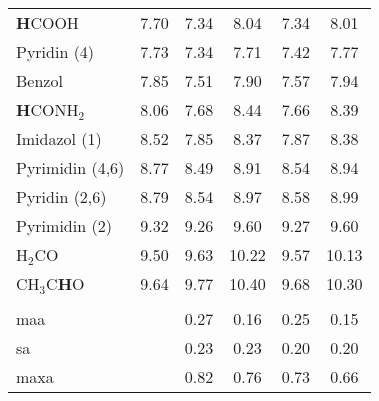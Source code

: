 \begin{table}[ht!]
{\begin{tabular}{lc|cc|cc}
    \textbf{H}COOH & 7.70   & 7.34  & 8.04  & 7.34  & 8.01 \\
    Pyridin (4) & 7.73  & 7.34  & 7.71  & 7.42  & 7.77 \\
    Benzol & 7.85  & 7.51  & 7.90   & 7.57  & 7.94 \\
    \textbf{H}CONH$_{2}$ & 8.06  & 7.68  & 8.44  & 7.66  & 8.39 \\
    Imidazol (1) & 8.52  & 7.85  & 8.37  & 7.87  & 8.38 \\
    Pyrimidin (4,6) & 8.77  & 8.49  & 8.91  & 8.54  & 8.94 \\
    Pyridin (2,6) & 8.79  & 8.54  & 8.97  & 8.58  & 8.99 \\
    Pyrimidin (2) & 9.32  & 9.26  & 9.60   & 9.27  & 9.60 \\
    H$_{2}$CO  & 9.50   & 9.63  & 10.22 & 9.57  & 10.13 \\
    CH$_{3}$C\textbf{H}O & 9.64  & 9.77  & 10.40  & 9.68  & 10.30 \\
          &       &       &       &       &  \\
    \ac{maa}   &       & 0.27  & 0.16  & 0.25  & 0.15 \\
    \ac{sa}  &       & 0.23  & 0.23  & 0.20   & 0.20 \\
    \ac{maxa}  &       & 0.82  & 0.76  & 0.73  & 0.66 \\
    \end{tabular}}%
  \label{tab:1hshifts}%
\end{table}%
\FloatBarrier


